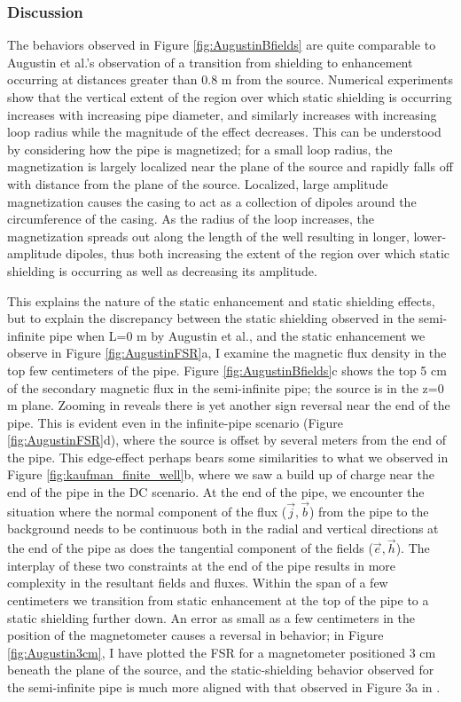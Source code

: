 \subsubsection{Discussion}
The behaviors observed in Figure \ref{fig:AugustinBfields} are quite comparable to Augustin et al.'s observation of a transition from shielding to enhancement occurring at distances greater than 0.8 m from the source. Numerical experiments show that the vertical extent of the region over which static shielding is occurring increases with increasing pipe diameter, and similarly increases with increasing loop radius while the magnitude of the effect decreases. This can be understood by considering how the pipe is magnetized; for a small loop radius, the magnetization is largely localized near the plane of the source and rapidly falls off with distance from the plane of the source. Localized, large amplitude magnetization causes the casing to act as a collection of dipoles around the circumference of the casing. As the radius of the loop increases, the magnetization spreads out along the length of the well resulting in longer, lower-amplitude dipoles, thus both increasing the extent of the region over which static shielding is occurring as well as decreasing its amplitude.




This explains the nature of the static enhancement and static shielding effects, but to explain the discrepancy between the static shielding observed in the semi-infinite pipe when L=0 m by Augustin et al., and the static enhancement we observe in Figure \ref{fig:AugustinFSR}a, I examine the magnetic flux density in the top few centimeters of the pipe. Figure \ref{fig:AugustinBfields}c shows the top 5 cm of the secondary magnetic flux in the semi-infinite pipe; the source is in the z=0 m plane.  Zooming in reveals there is yet another sign reversal near the end of the pipe. This is evident even in the infinite-pipe scenario (Figure \ref{fig:AugustinFSR}d), where the source is offset by several meters from the end of the pipe. This edge-effect perhaps bears some similarities to what we observed in Figure \ref{fig:kaufman_finite_well}b, where we saw a build up of charge near the end of the pipe in the DC scenario. At the end of the pipe, we encounter the situation where the normal component of the flux ($\vec{j}, \vec{b}$) from the pipe to the background needs to be continuous both in the radial and vertical directions at the end of the pipe as does the tangential component of the fields ($\vec{e}, \vec{h}$). The interplay of these two constraints at the end of the pipe results in more complexity in the resultant fields and fluxes. Within the span of a few centimeters we transition from static enhancement at the top of the pipe to a static shielding further down. An error as small as a few centimeters in the position of the magnetometer causes a reversal in behavior; in Figure \ref{fig:Augustin3cm}, I have plotted the FSR for a magnetometer positioned 3 cm beneath the plane of the source, and the static-shielding behavior observed for the semi-infinite pipe is much more aligned with that observed in Figure 3a in \cite{Augustin1989}.



